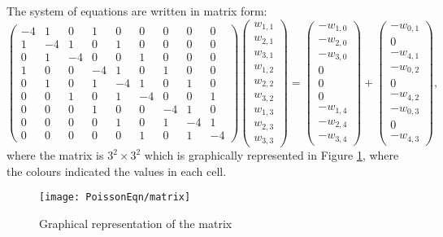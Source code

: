 The system of equations are written in matrix form:
\[\left(\begin{array}{ccccccccc}
-4& 1 & 0 &1 &0 &0 &0 &0 &0\\
1&-4& 1 & 0 &1 &0 &0 &0 &0 \\
0 &1&-4&  0&0 &1 &0 &0 &0 \\
1 &0 &0 &-4& 1 & 0 &1 &0 &0\\
0 & 1 &0 &1&-4& 1 &0 &1 &0  \\
0 &0 &1 &0 &1&-4&0&  0 &1  \\
0&0&0&1 &0 &0 &-4& 1 & 0\\
0&0&0&0 & 1 &0 &1&-4& 1   \\
0&0&0&0 &0 &1 &0 &1&-4
\end{array}\right)
\left(\begin{array}{c}
w_{1,1}\\
w_{2,1}\\
w_{3,1}\\
w_{1,2}\\
w_{2,2}\\
w_{3,2}\\
w_{1,3}\\
w_{2,3}\\
w_{3,3}
\end{array}\right)=
\left(\begin{array}{c}
-w_{1,0}\\
-w_{2,0}\\
-w_{3,0}\\
0\\
0\\
0\\
-w_{1,4}\\
-w_{2,4}\\
-w_{3,4}
\end{array}\right)
+\left(\begin{array}{c}
-w_{0,1}\\
0\\
-w_{4,1}\\
-w_{0,2}\\
0\\
-w_{4,2}\\
-w_{0,3}\\
0\\
-w_{4,3}
\end{array}\right),
\]	
where the matrix is $3^2\times 3^2$ which is graphically represented in Figure \ref{9x9 Matrix}, where the colours indicated the values in each cell.
\begin{figure}[H]
  \caption{Graphical representation of the matrix}\label{9x9 Matrix}
  \centering
    \texttt{[image: PoissonEqn/matrix]}
\end{figure}


